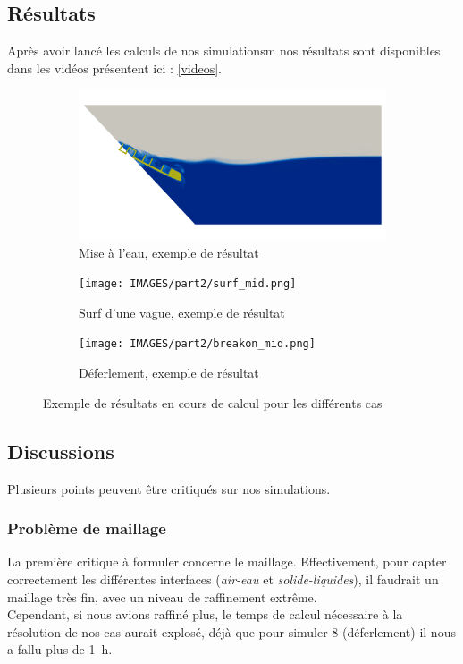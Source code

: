 \documentclass[../main.tex]{subfiles}
\begin{document}
\subsection{Résultats}
Après avoir lancé les calculs de nos simulationsm nos résultats sont disponibles dans les vidéos présentent ici : \href{https://github.com/YohStablo/CERF_ZEPHYR/tree/main/VIDEOS}{[videos]}.

\begin{figure}[H]
\centering
\begin{subfigure}[b]{11cm}
    \centering
    \includegraphics[width=\linewidth]{IMAGES/part2/zephyr_launching.0072.png}
    \caption{Mise à l'eau, exemple de résultat}
\end{subfigure}
\vfill
\begin{subfigure}[b]{11cm}
    \centering
    \texttt{[image: IMAGES/part2/surf\_mid.png]}
    \caption{Surf d'une vague, exemple de résultat}
\end{subfigure}
\vfill
\begin{subfigure}[b]{11cm}
    \centering
    \texttt{[image: IMAGES/part2/breakon\_mid.png]}
    \caption{Déferlement, exemple de résultat}
\end{subfigure}
\caption{Exemple de résultats en cours de calcul pour les différents cas}
\end{figure}

\subsection{Discussions}
Plusieurs points peuvent être critiqués sur nos simulations.

\subsubsection*{Problème de maillage}
La première critique à formuler concerne le maillage. Effectivement, pour capter correctement les différentes interfaces (\textit{air-eau} et \textit{solide-liquides}), il faudrait un maillage très fin, avec un niveau de raffinement extrême.\\
Cependant, si nous avions raffiné plus, le temps de calcul nécessaire à la résolution de nos cas aurait explosé, déjà que pour simuler \qty{8}{\sec} (déferlement) il nous a fallu plus de \qty{1}{\hour}.\\
\end{document}
